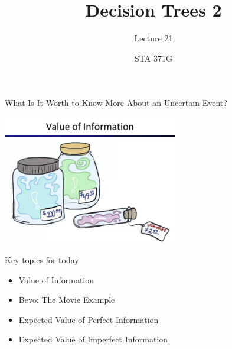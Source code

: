 \documentclass{beamer}\usepackage[]{graphicx}\usepackage[]{color}
\title{Decision Trees 2}
\subtitle{Lecture 21}
\author{STA 371G}
\begin{document}
  
  

  \frame{\maketitle}



  \begin{darkframes}
    

    \begin{frame}{What Is It Worth to Know More About an Uncertain Event?}
      \fontsize{10}{10}\selectfont
     \begin{center}
      \includegraphics[width=3in]{ValueOfInformation.png} 
      \end{center}

    \lc %
      
    \end{frame}

    \begin{frame}{Key topics for today}
      \fontsize{10}{10}\selectfont
        \begin{itemize}[<+->]
            \item Value of Information
            \item Bevo: The Movie Example
            \item Expected Value of Perfect Information
            \item Expected Value of Imperfect Information
        \end{itemize}
      
    \end{frame}



\end{darkframes}
\end{document}
